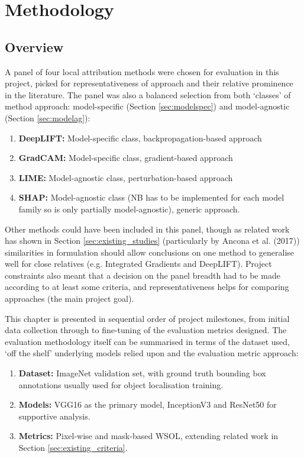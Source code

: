 \documentclass[main]{subfiles}
\begin{document}
\chapter{Methodology}

\section{Overview}

A panel of four local attribution methods were chosen for evaluation in this project, picked for representativeness of approach and their relative prominence in the literature. The panel was also a balanced selection from both `classes' of method approach: model-specific (Section \ref{sec:modelspec}) and model-agnostic (Section \ref{sec:modelag}):

\begin{enumerate}

\item \textbf{DeepLIFT:} Model-specific class, backpropagation-based approach
\item \textbf{GradCAM:} Model-specific class, gradient-based approach
\item \textbf{LIME:} Model-agnostic class, perturbation-based approach
\item \textbf{SHAP:} Model-agnostic class (NB has to be implemented for each model family so is only partially model-agnostic), generic approach.

\end{enumerate}

Other methods could have been included in this panel, though as related work has shown in Section \ref{sec:existing_studies} (particularly by Ancona et al. (2017)) similarities in formulation should allow conclusions on one method to generalise well for close relatives (e.g. Integrated Gradients and DeepLIFT). Project constraints also meant that a decision on the panel breadth had to be made according to at least some criteria, and representativeness helps for comparing approaches (the main project goal).

This chapter is presented in sequential order of project milestones, from initial data collection through to fine-tuning of the evaluation metrics designed. The evaluation methodology itself can be summarised in terms of the dataset used, `off the shelf' underlying models relied upon and the evaluation metric approach:
\newpage

\begin{enumerate}
\item \textbf{Dataset:} ImageNet validation set, with ground truth bounding box annotations usually used for object localisation training. 
\item \textbf{Models:} VGG16 as the primary model, InceptionV3 and ResNet50 for supportive analysis.
\item \textbf{Metrics:} Pixel-wise and mask-based WSOL, extending related work in Section \ref{sec:existing_criteria}.
\end{enumerate}
\end{document}
